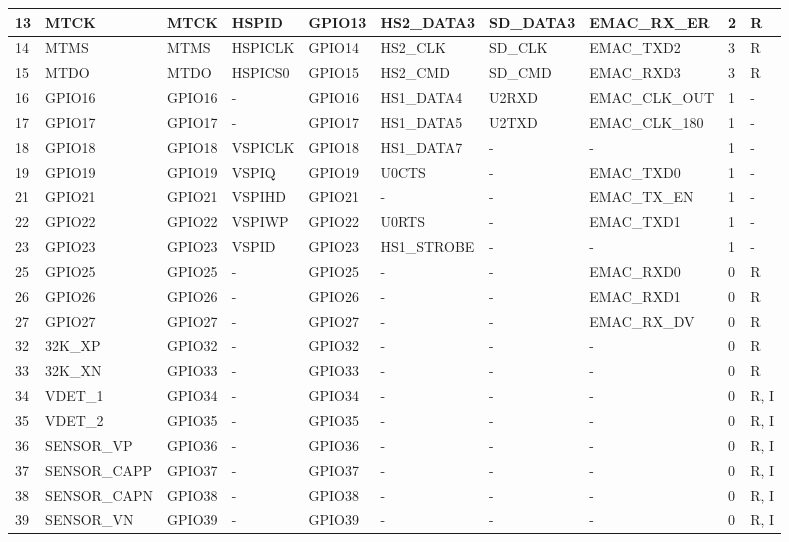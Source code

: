 \begin{longtable}[c]{|p{0.55cm}|p{1.8cm}|p{1.4cm}|p{1.4cm}|p{1.4cm}|p{1.6cm}|p{1.4cm}|p{2.0cm}|p{0.55cm}|p{0.55cm}| }
\hline
13 & MTCK     & MTCK     & HSPID    & GPIO13   & HS2\_DATA3 & SD\_DATA3 & EMAC\_RX\_ER & 2 & R \\
\hline
14 & MTMS     & MTMS     & HSPICLK  & GPIO14   & HS2\_CLK & SD\_CLK  & EMAC\_TXD2 & 3 & R \\
\hline
15 & MTDO     & MTDO     & HSPICS0  & GPIO15   & HS2\_CMD & SD\_CMD  & EMAC\_RXD3 & 3 & R \\
\hline
16 & GPIO16   & GPIO16   & -        & GPIO16   & HS1\_DATA4 & U2RXD    & EMAC\_CLK\_OUT & 1 & - \\
\hline
17 & GPIO17   & GPIO17   & -        & GPIO17   & HS1\_DATA5 & U2TXD    & EMAC\_CLK\_180 & 1 & - \\
\hline
18 & GPIO18   & GPIO18   & VSPICLK  & GPIO18   & HS1\_DATA7 & -        & -        & 1 & - \\
\hline
19 & GPIO19   & GPIO19   & VSPIQ    & GPIO19   & U0CTS    & -        & EMAC\_TXD0 & 1 & - \\
\hline
21 & GPIO21   & GPIO21   & VSPIHD   & GPIO21   & -        & -        & EMAC\_TX\_EN & 1 & - \\
\hline
22 & GPIO22   & GPIO22   & VSPIWP   & GPIO22   & U0RTS    & -        & EMAC\_TXD1 & 1 & - \\
\hline
23 & GPIO23   & GPIO23   & VSPID    & GPIO23   & HS1\_STROBE & -        & -        & 1 & - \\
\hline
25 & GPIO25   & GPIO25   & -        & GPIO25   & -        & -        & EMAC\_RXD0 & 0 & R \\
\hline
26 & GPIO26   & GPIO26   & -        & GPIO26   & -        & -        & EMAC\_RXD1 & 0 & R \\
\hline
27 & GPIO27   & GPIO27   & -        & GPIO27   & -        & -        & EMAC\_RX\_DV & 0 & R \\
\hline
32 & 32K\_XP  & GPIO32   & -        & GPIO32   & -        & -        & -        & 0 & R \\
\hline
33 & 32K\_XN  & GPIO33   & -        & GPIO33   & -        & -        & -        & 0 & R \\
\hline
34 & VDET\_1  & GPIO34   & -        & GPIO34   & -        & -        & -        & 0 & R, I \\
\hline
35 & VDET\_2  & GPIO35   & -        & GPIO35   & -        & -        & -        & 0 & R, I \\
\hline
36 & SENSOR\_VP & GPIO36   & -        & GPIO36   & -        & -        & -        & 0 & R, I \\
\hline
37 & SENSOR\_CAPP & GPIO37   & -        & GPIO37   & -        & -        & -        & 0 & R, I \\
\hline
38 & SENSOR\_CAPN & GPIO38   & -        & GPIO38   & -        & -        & -        & 0 & R, I \\
\hline
39 & SENSOR\_VN & GPIO39   & -        & GPIO39   & -        & -        & -        & 0 & R, I \\
\hline
    \end{longtable}
\normalsize
